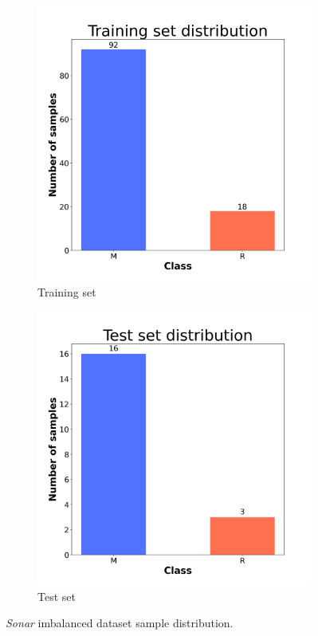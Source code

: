 \begin{figure}[H]
    \centering
    \begin{subfigure}[t]{0.45\textwidth}
        \centering
        \includegraphics[width=1\textwidth]{images/exper2/Sonar/train_dist.png}
        \caption{Training set}
    \end{subfigure}
    \begin{subfigure}[t]{0.45\textwidth}
        \centering
        \includegraphics[width=1\textwidth]{images/exper2/Sonar/test_dist.png}
        \caption{Test set}
    \end{subfigure}
    \caption{\textit{Sonar} imbalanced dataset sample distribution.}
\end{figure}

